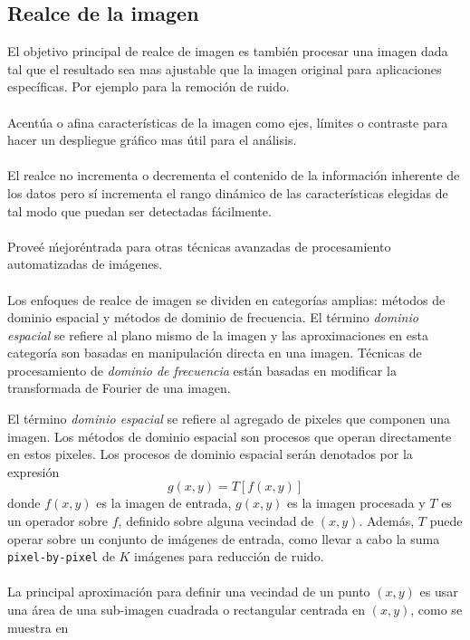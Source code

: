                 
        \subsection{Realce de la imagen}
            El objetivo principal de realce de imagen es también procesar una imagen dada tal que el resultado sea mas ajustable que la imagen original para aplicaciones específicas. Por ejemplo para la remoción de ruido.
            \\\\%
            Acentúa o afina características de la imagen como ejes, límites o contraste para hacer un despliegue gráfico mas útil para el análisis.
            \\\\%
            El realce no incrementa o decrementa el contenido de la información inherente de los datos pero sí incrementa el rango dinámico de las características elegidas de tal modo que puedan ser detectadas fácilmente.
            \\\\%
            Proveé \'mejor\' entrada para otras técnicas avanzadas de procesamiento automatizadas de imágenes.
			\\\\%
			Los enfoques de realce de imagen se dividen en categorías amplias: métodos de dominio espacial y métodos de dominio de frecuencia. El término \textit{dominio espacial} se refiere al plano mismo de la imagen y las aproximaciones en esta categoría son basadas en manipulación directa en una imagen. Técnicas de procesamiento de  \textit{dominio de frecuencia} están basadas en modificar la transformada de Fourier de una imagen.
			
			El término \textit{dominio espacial} se refiere al agregado de pixeles que componen una imagen. Los métodos de dominio espacial son procesos que operan directamente en estos pixeles. Los procesos de dominio espacial serán denotados por la expresión
			\begin{equation}
				g(x,y) = T[f(x,y)]
			\end{equation}
			donde $f(x,y)$ es la imagen de entrada, $g(x,y)$ es la imagen procesada y $T$ es un operador sobre $f$, definido sobre alguna vecindad de $(x,y)$. Además, $T$ puede operar sobre un conjunto de imágenes de entrada, como llevar a cabo la suma \texttt{pixel-by-pixel} de $K$ imágenes para reducción de ruido.
			\\\\%
			La principal aproximación para definir una vecindad de un punto $(x,y)$ es usar una área de una sub-imagen cuadrada o rectangular centrada en $(x,y)$, como se muestra en %
			

